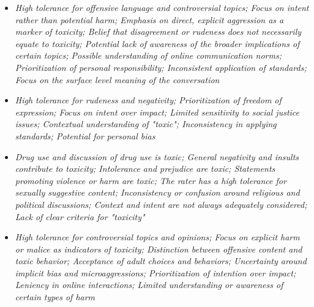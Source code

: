 \documentclass[11pt]{article}
\newcommand{\profiletext}[1]{\textit{#1}}
\begin{document}
\begin{itemize}
\item \profiletext{High tolerance for offensive language and controversial topics; Focus on intent rather than potential harm; Emphasis on direct, explicit aggression as a marker of toxicity; Belief that disagreement or rudeness does not necessarily equate to toxicity; Potential lack of awareness of the broader implications of certain topics; Possible understanding of online communication norms; Prioritization of personal responsibility; Inconsistent application of standards; Focus on the surface level meaning of the conversation}
\item \profiletext{High tolerance for rudeness and negativity; Prioritization of freedom of expression; Focus on intent over impact; Limited sensitivity to social justice issues; Contextual understanding of "toxic"; Inconsistency in applying standards; Potential for personal bias}
\item \profiletext{Drug use and discussion of drug use is toxic; General negativity and insults contribute to toxicity; Intolerance and prejudice are toxic; Statements promoting violence or harm are toxic; The rater has a high tolerance for sexually suggestive content; Inconsistency or confusion around religious and political discussions; Context and intent are not always adequately considered; Lack of clear criteria for "toxicity"}
\item \profiletext{High tolerance for controversial topics and opinions; Focus on explicit harm or malice as indicators of toxicity; Distinction between offensive content and toxic behavior; Acceptance of adult choices and behaviors; Uncertainty around implicit bias and microaggressions; Prioritization of intention over impact; Leniency in online interactions; Limited understanding or awareness of certain types of harm}
\end{itemize}
\end{document}
